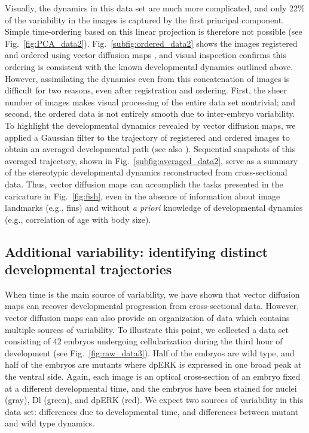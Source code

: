 \documentclass{pnastwo}
\newcommand{\fig}[0]{Fig.}
\begin{document}
\begin{article}
Visually, the dynamics in this data set are much more complicated, and only 22\% of the variability in the images is captured by the first principal component.
%
Simple time-ordering based on this linear projection is therefore not possible (see \fig~\ref{fig:PCA_data2}).
%
%
\fig~\ref{subfig:ordered_data2} shows the images registered and ordered using vector diffusion maps \cite{singer2012vector}, 
and visual inspection confirms this ordering is consistent with the known developmental dynamics outlined above.
%
However, assimilating the dynamics even from this concatenation of images is difficult for two reasons, even after registration and ordering.
%
First, the sheer number of images makes visual processing of the entire data set nontrivial;
and second, the ordered data is not entirely smooth due to inter-embryo variability.
%
To highlight the developmental dynamics revealed by vector diffusion maps, we applied a Gaussian filter to the trajectory of registered and ordered images to obtain an averaged developmental path (see also \cite{kemelmacher2011exploring}).  
%
Sequential snapshots of this averaged trajectory, shown in \fig~\ref{subfig:averaged_data2}, serve as a summary of the stereotypic developmental dynamics reconstructed from cross-sectional data.
%
Thus, vector diffusion maps can accomplish the tasks presented in the caricature in \fig~\ref{fig:fish}, even in the absence of information about image landmarks (e.g., fins) and without {\it a priori} knowledge of developmental dynamics (e.g., correlation of age with body size).



\subsection{Additional variability: identifying distinct developmental trajectories}

When time is the main source of variability, we have shown that vector diffusion maps can recover developmental progression from cross-sectional data.
%
However, vector diffusion maps can also provide an organization of data which contains multiple sources of variability.
%
To illustrate this point, we collected a data set consisting of $42$ embryos undergoing cellularization during the third hour of development (see \fig~\ref{fig:raw_data3}).
%
Half of the embryos are wild type, and half of the embryos are mutants where dpERK is expressed in one broad peak at the ventral side.
%
Again, each image is an optical cross-section of an embryo fixed at a different developmental time, and the embryos have been stained for nuclei (gray), Dl (green), and dpERK (red).
%
We expect two sources of variability in this data set: differences due to developmental time, and differences between mutant and wild type dynamics.





\end{article}
\end{document}
